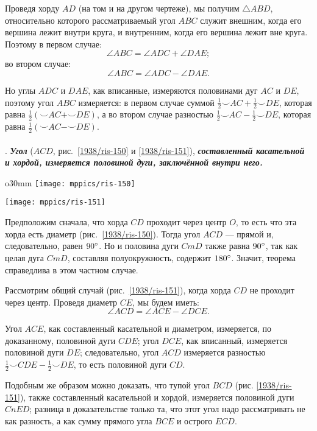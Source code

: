 Проведя хорду $AD$ (на том и на другом чертеже), мы получим $\triangle ABD$, относительно которого рассматриваемый угол $ABC$ служит внешним, когда его вершина лежит внутри круга, и внутренним, когда его вершина лежит вне круга.
Поэтому в первом случае:
\[\angle ABC = \angle ADC+\angle DAE;\]
во втором случае:
\[\angle ABC = \angle ADC-\angle DAE.\]

Но углы $ADC$ и $DAE$, как вписанные, измеряются половинами дуг $AC$ и $DE$, поэтому угол $ABC$ измеряется:
в первом случае суммой
$\tfrac12{\smallsmile}AC+\tfrac12{\smallsmile}DE$, которая равна $\tfrac12({\smallsmile}AC+{\smallsmile}DE)$, а во втором случае разностью $\tfrac12{\smallsmile}AC-\tfrac12{\smallsmile}DE$, которая равна $\tfrac12({\smallsmile}AC-{\smallsmile}DE)$.

\paragraph{}\label{1938/131}
.
\textbf{\emph{Угол}} ($ACD$, рис.~\ref{1938/ris-150} и \ref{1938/ris-151}), \textbf{\emph{составленный касательной и хордой, измеряется половиной дуги, заключённой внутри него.}}

\begin{wrapfigure}{o}{30mm}
\vskip-3mm
\centering
\texttt{[image: mppics/ris-150]}
\caption{}\label{1938/ris-150}
\bigskip
\texttt{[image: mppics/ris-151]}
\caption{}\label{1938/ris-151}
\end{wrapfigure}

Предположим сначала, что хорда $CD$ проходит через центр $O$, то есть что эта хорда есть диаметр (рис.~\ref{1938/ris-150}).
Тогда угол $ACD$ — прямой и,
следовательно, равен $90\degree$.
Но и половина дуги $CmD$ также равна $90\degree$, так как целая дуга $CmD$, составляя полуокружность, содержит $180\degree$.
Значит, теорема справедлива в этом частном случае.

Рассмотрим общий случай (рис.~\ref{1938/ris-151}), когда хорда $CD$ не проходит через центр.
Проведя диаметр $CE$, мы будем иметь:
\[\angle ACD = \angle ACE - \angle DCE.\]

Угол $ACE$, как составленный касательной и диаметром, измеряется, по доказанному, половиной дуги $CDE$;
угол $DCE$, как вписанный, измеряется половиной дуги $DE$;
следовательно, угол $ACD$ измеряется разностью $\tfrac12{\smallsmile}CDE-\tfrac12{\smallsmile}DE$, то есть половиной дуги $CD$.

Подобным же образом можно доказать, что тупой угол $BCD$ (рис. \ref{1938/ris-151}), также составленный касательной и хордой, измеряется половиной дуги $CnED$;
разница в доказательстве только та, что этот угол надо рассматривать не как разность, а как сумму прямого угла $BCE$ и острого $ECD$.


